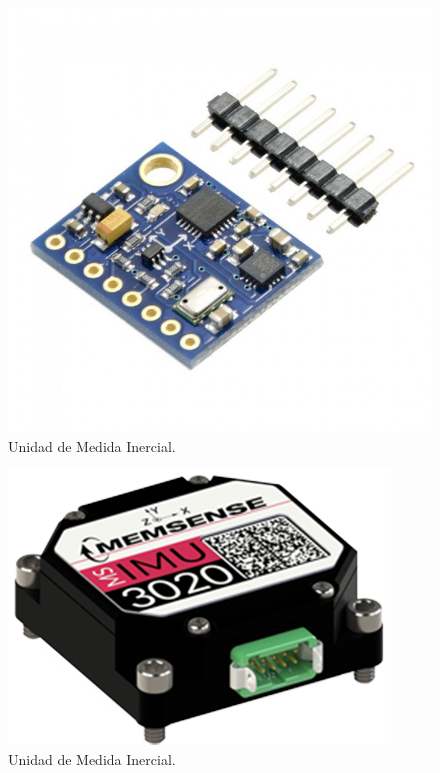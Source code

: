 	\begin{figure}[H]
	\center
	\includegraphics[scale=0.2]{imagenes/Balancing_robot/IMU1}
	\caption{Unidad de Medida Inercial.}
	\label{fig:IMU1}
\end{figure}

	\begin{figure}[H]
	\center
	\includegraphics[scale=0.2]{imagenes/Balancing_robot/IMU2}
	\caption{Unidad de Medida Inercial.}
	\label{fig:IMU2}
\end{figure}

